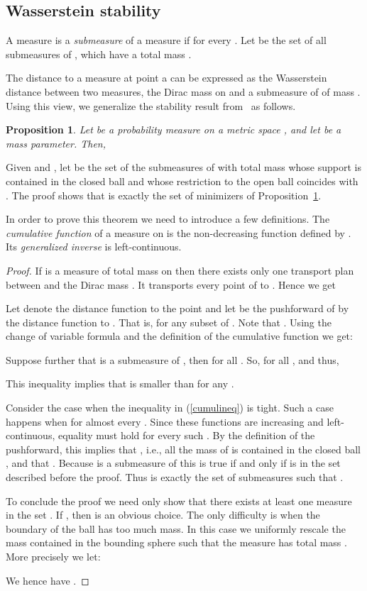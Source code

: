 \documentclass[a4paper]{article}
\newtheorem{proposition}[theorem]{Proposition}
\begin{document}
\subsection{Wasserstein stability}

A measure  is a \emph{submeasure} of a measure  if for every .
Let  be the set of all submeasures of , which have a total mass .

The distance to a measure  at point a  can be expressed as the Wasserstein distance between two measures,
the Dirac mass  on 
and a submeasure of  of mass .
Using this view, we generalize the stability result from~\cite{gipmCCM} as follows. 

\begin{proposition}\label{Wwriting}
Let  be a probability measure on a metric space , and let  be a mass parameter. Then,

\end{proposition}

Given  and , let  be the set of the submeasures of  with total mass  whose support is contained in the closed ball  and whose restriction to the open ball  coincides with .
The proof shows that  is exactly the set of minimizers of Proposition~\ref{Wwriting}. 


In order to prove this theorem we need to introduce a few definitions.
The \emph{cumulative function}  of a measure  on  is the non-decreasing function defined by .
Its \emph{generalized inverse}  is left-continuous. 

\begin{proof}
If  is a measure of total mass  on  then there exists only one transport plan between  and the Dirac mass .
It transports every point of  to .
Hence we get


Let  denote the distance function to the point  and let  be the pushforward of  by the distance function to .
That is, for any subset  of . 
Note that .
Using the change of variable formula and the definition of the cumulative function we get:


Suppose further that  is a submeasure of , then  for all . 
So,  for all , and thus,

This inequality implies that  is smaller than  for any .

Consider the case when the inequality in (\ref{cumulineq}) is tight.
Such a case happens when for almost every .
Since these functions are increasing and left-continuous, equality must hold for every such .
By the definition of the pushforward, this implies that , i.e., all the mass of  is contained in the closed ball , and that .
Because  is a submeasure of  this is true if and only if  is in the set  described before the proof.
Thus  is exactly the set of submeasures  such that .

To conclude the proof we need only show that there exists at least one measure  in the set .
If , then  is an obvious choice.
The only difficulty is when the boundary  of the ball has too much mass.
In this case we uniformly rescale the mass contained in the bounding sphere such that the measure  has total mass . 
More precisely we let:

We hence have .
\end{proof}
\end{document}
